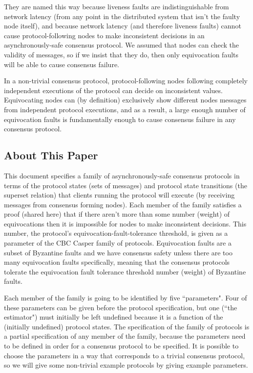 \documentclass{article}
\theoremstyle{definition}
\begin{document}
They are named this way because liveness faults are indistinguishable from network latency (from any point in the distributed system that isn't the faulty node itself), and because network latency (and therefore liveness faults) cannot cause protocol-following nodes to make inconsistent decisions in an asynchronously-safe consensus protocol. We assumed that nodes can check the validity of messages, so if we insist that they do, then only equivocation faults will be able to cause consensus failure.

In a non-trivial consensus protocol, protocol-following nodes following completely independent executions of the protocol can decide on inconsistent values. Equivocating nodes can (by definition) exclusively show different nodes messages from independent protocol executions, and as a result, a large enough number of equivocation faults is fundamentally enough to cause consensus failure in any consensus protocol.

\subsection{About This Paper}

This document specifies a family of asynchronously-safe consensus protocols in terms of the protocol states (sets of messages) and protocol state transitions (the superset relation) that clients running the protocol will execute (by receiving messages from consensus forming nodes). Each member of the family satisfies a proof (shared here) that if there aren't more than some number (weight) of equivocations then it is impossible for nodes to make inconsistent decisions. This number, the protocol's equivocation-fault-tolerance threshold, is given as a parameter of the CBC Casper family of protocols. Equivocation faults are a subset of Byzantine faults and we have consensus safety unless there are too many equivocation faults specifically, meaning that the consensus protocols tolerate the equivocation fault tolerance threshold number (weight) of Byzantine faults.

Each member of the family is going to be identified by five ``parameters". Four of these parameters can be given before the protocol specification, but one (``the estimator") must initially be left undefined because it is a function of the (initially undefined) protocol states. The specification of the family of protocols is a partial specification of any member of the family, because the parameters need to be defined in order for a consensus protocol to be specified. It is possible to choose the parameters in a way that corresponds to a trivial consensus protocol, so we will give some non-trivial example protocols by giving example parameters.
\end{document}
